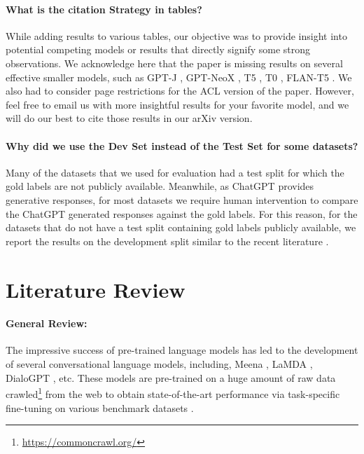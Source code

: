 \documentclass[11pt]{article}
\begin{document}
\paragraph{What is the citation Strategy in tables?} While adding results to various tables, our objective was to provide insight into potential competing models or results that directly signify some strong observations. We acknowledge here that the paper is missing results on several effective smaller models, such as GPT-J \citep{mesh-transformer-jax}, GPT-NeoX \citep{black2022gptneox20b}, T5 \citep{t5}, T0 \cite{T0},  FLAN-T5 \citep{FLAN-t5}. We also had to consider page restrictions for the ACL version of the paper. However, feel free to email us with more insightful results for your favorite model, and we will do our best to cite those results in our arXiv version.






\paragraph{Why did we use the Dev Set instead of the Test Set for some datasets?}

Many of the datasets that we used for evaluation had a test split for which the gold labels are not publicly available. Meanwhile, as ChatGPT provides generative responses, for most datasets we require human intervention to compare the ChatGPT generated responses against the gold labels. For this reason, for the datasets that do not have a test split containing gold labels publicly available, we report the results on the development split similar to the recent literature \cite{T0,chowdhery2022palm,rae2021scalinggopher,du2022glam,touvron2023llama}.





%
 \section{Literature Review}

\paragraph{General Review:}
The impressive success of pre-trained language models \citep{radford2019language,bert,liu2019roberta,t5,GPT3,liu2023pre,zhou2023comprehensive} has led to the development of several conversational language models, including, Meena \citep{meena}, LaMDA \citep{lambda}, DialoGPT \citep{zhang2019dialogpt}, etc. These models are pre-trained on a huge amount of raw data \cite{t5,OrtizSuarezSagotRomary2019,pile} crawled\footnote{\url{https://commoncrawl.org/}} from the web to obtain state-of-the-art performance via task-specific fine-tuning \cite{bert,pfeiffer-etal-2021-adapterfusion,li-liang-2021-prefix,hu2021lora,lester-etal-2021-power} on various benchmark datasets \cite{wang-etal-2018-glue,super_glue,xtreme,Liang2020XGLUEAN,codexglue}.
\end{document}
